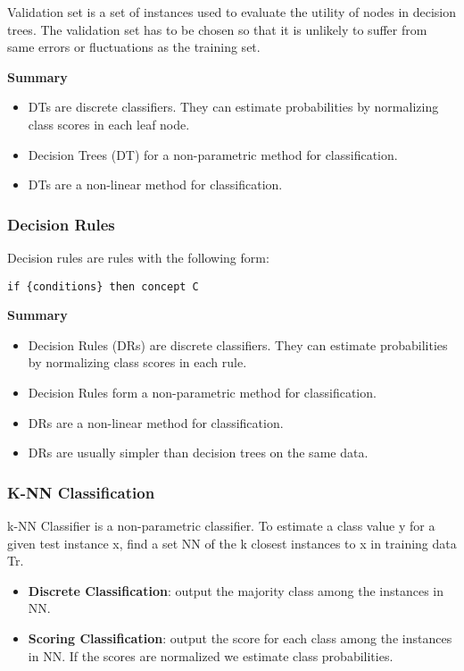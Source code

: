 Validation set is a set of instances used to evaluate the utility of nodes in decision trees. The validation set has to be chosen so that it is unlikely to suffer from same errors or fluctuations as the training set.

\textbf{Summary}
\begin{itemize}[noitemsep]
    \item DTs are discrete classifiers. They can estimate probabilities by normalizing class scores in each leaf node.
    \item Decision Trees (DT) for a non-parametric method for classification.
    \item DTs are a non-linear method for classification.
\end{itemize}

\subsubsection*{Decision Rules}
Decision rules are rules with the following form:
\begin{verbatim}
if {conditions} then concept C
\end{verbatim}

\textbf{Summary}
\begin{itemize}[noitemsep]
    \item Decision Rules (DRs) are discrete classifiers. They can estimate probabilities by normalizing class scores in each rule.
    \item Decision Rules form a non-parametric method for classification.
    \item DRs are a non-linear method for classification.
    \item DRs are usually simpler than decision trees on the same data.
\end{itemize}

\subsubsection*{K-NN Classification}
k-NN Classifier is a non-parametric classifier. To estimate a class value y for a given test instance x, find a set NN of the k closest instances to x in training data Tr.
\begin{itemize}[noitemsep]
    \item \textbf{Discrete Classification}: output the majority class among the instances in NN.
    \item \textbf{Scoring Classification}: output the score for each class among the instances in NN. If the scores are normalized we estimate class probabilities.
\end{itemize}

